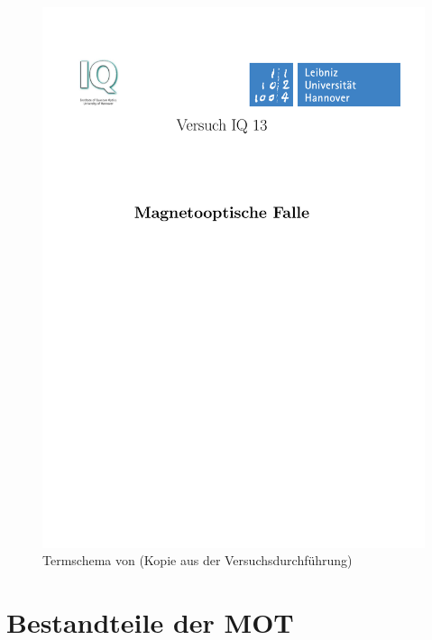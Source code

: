 \documentclass[12pt, a4paper]{article}
\begin{document}
  \begin{figure}[h!]
  \centering
  \includegraphics[page=10, width=\textwidth, trim=27mm 56mm 33mm 52mm, clip]{MOTDurchfuehrung.pdf}
  \caption{Termschema von  (Kopie aus der Versuchsdurchführung)}
  \label{rb}
  \end{figure}
\newpage
\section{Bestandteile der MOT}
\end{document}
